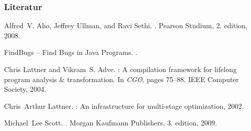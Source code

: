 \documentclass[ucs,9pt]{beamer}
\begin{document}
\begin{frame}
  \frametitle{Literatur}
    
  \begin{thebibliography}{10}
    
  \beamertemplatebookbibitems

  
    Alfred~V. Aho, Jeffrey Ullman, and Ravi Sethi.
    .
    \newblock Pearson Studium, 2. edition, 2008.


    {F}ind{B}ugs -- {F}ind {B}ugs in {J}ava {P}rograms.
    .


    Chris Lattner and Vikram~S. Adve.
    : {A} compilation framework for lifelong program analysis \&
      transformation.
      \newblock In {\em CGO}, pages 75--88. IEEE Computer Society, 2004.

      Chris~Arthur Lattner.
      : An infrastructure for multi-stage optimization, 2002.

      Michael~Lee Scott.
      .
      \newblock Morgan Kaufmann Publishers, 3. edition, 2009.
    
  \end{thebibliography}
\end{frame}
\end{document}
